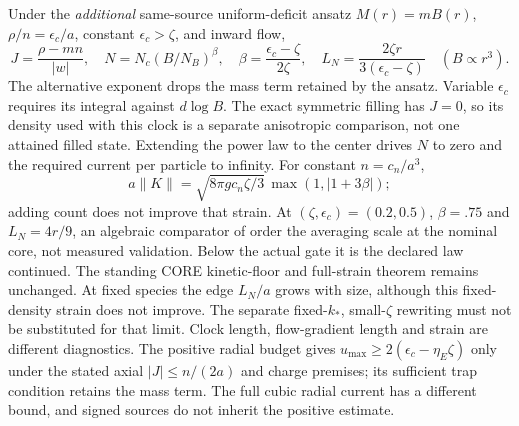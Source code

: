 \documentclass[10pt]{article}
\begin{document}
Under the \emph{additional} same-source uniform-deficit
ansatz \(M(r)=mB(r)\), \(\rho/n=\epsilon_c/a\),
constant \(\epsilon_c>\zeta\), and inward flow,
\[
 J=\frac{\rho-mn}{|w|},\quad
 N=N_c(B/N_B)^\beta,\quad
 \beta=\frac{\epsilon_c-\zeta}{2\zeta},\quad
 L_N=\frac{2\zeta r}{3(\epsilon_c-\zeta)}
 \quad(B\propto r^3).
\]
The alternative exponent drops the mass term retained
by the ansatz. Variable \(\epsilon_c\) requires its
integral against \(d\log B\). The exact symmetric
filling has \(J=0\), so its density used with this
clock is a separate anisotropic comparison, not one
attained filled state. Extending the power law to the
center drives \(N\) to zero and the required current
per particle to infinity. For constant \(n=c_n/a^3\),
\[
 a\|K\|=\sqrt{8\pi g c_n\zeta/3}\,
            \max(1,|1+3\beta|);
\]
adding count does not improve that strain. At
\((\zeta,\epsilon_c)=(0.2,0.5)\), \(\beta=.75\) and
\(L_N=4r/9\), an algebraic comparator of order the
averaging scale at the nominal core, not measured
validation. Below the actual gate it is the declared
law continued. The standing CORE kinetic-floor and
full-strain theorem remains unchanged.
At fixed species the edge \(L_N/a\) grows with size,
although this fixed-density strain does not improve.
The separate fixed-\(k_*\), small-\(\zeta\) rewriting
must not be substituted for that limit. Clock length,
flow-gradient length and strain are different diagnostics.
The positive radial budget gives
\(u_{\max}\ge2(\epsilon_c-\eta_E\zeta)\) only under
the stated axial \(|J|\le n/(2a)\) and charge premises;
its sufficient trap condition retains the mass term.
The full cubic radial current has a different bound,
and signed sources do not inherit the positive estimate.
\end{document}
